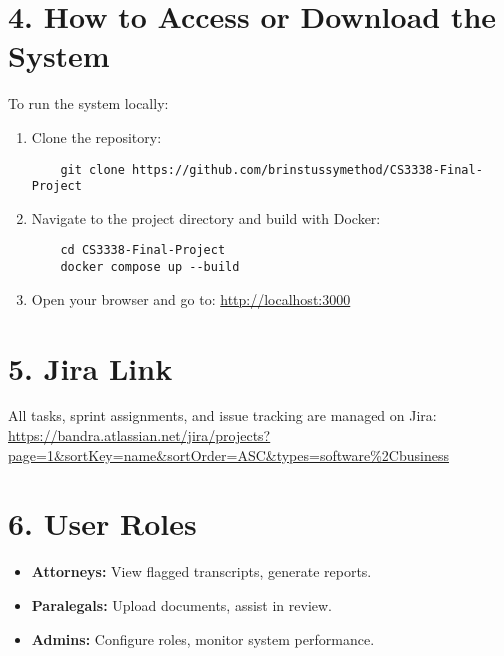\documentclass[11pt]{article}
\begin{document}
\section*{4. How to Access or Download the System}
To run the system locally:
\begin{enumerate}
    \item Clone the repository:
    \begin{verbatim}
    git clone https://github.com/brinstussymethod/CS3338-Final-Project
    \end{verbatim}
    \item Navigate to the project directory and build with Docker:
    \begin{verbatim}
    cd CS3338-Final-Project
    docker compose up --build
    \end{verbatim}
    \item Open your browser and go to:
    \url{http://localhost:3000}
\end{enumerate}

\section*{5. Jira Link}
All tasks, sprint assignments, and issue tracking are managed on Jira: \\
\url{https://bandra.atlassian.net/jira/projects?page=1&sortKey=name&sortOrder=ASC&types=software%2Cbusiness}

\section*{6. User Roles}
\begin{itemize}
    \item \textbf{Attorneys:} View flagged transcripts, generate reports.
    \item \textbf{Paralegals:} Upload documents, assist in review.
    \item \textbf{Admins:} Configure roles, monitor system performance.
\end{itemize}
\end{document}
